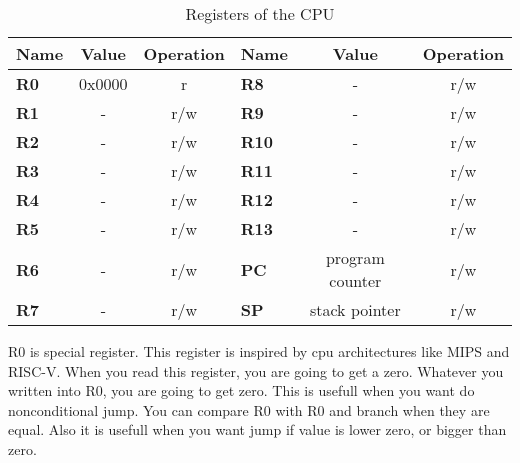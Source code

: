 \begin{table}[h]
    \centering
    \caption{Registers of the CPU}
    \label{tab:registers}
    \begin{tabular}{|l|c|c|l|c|c|}
        \hline
        \multicolumn{1}{|c|}{\textbf{Name}} & \textbf{Value} & \textbf{Operation} & \multicolumn{1}{c|}{\textbf{Name}} & \textbf{Value}  & \textbf{Operation} \\ \hline
        \textbf{R0}                         & 0x0000         & r                  & \textbf{R8}                        & -               & r/w                \\ \hline
        \textbf{R1}                         & -              & r/w                & \textbf{R9}                        & -               & r/w                \\ \hline
        \textbf{R2}                         & -              & r/w                & \textbf{R10}                       & -               & r/w                \\ \hline
        \textbf{R3}                         & -              & r/w                & \textbf{R11}                       & -               & r/w                \\ \hline
        \textbf{R4}                         & -              & r/w                & \textbf{R12}                       & -               & r/w                \\ \hline
        \textbf{R5}                         & -              & r/w                & \textbf{R13}                       & -               & r/w                \\ \hline
        \textbf{R6}                         & -              & r/w                & \textbf{PC}                        & program counter & r/w                \\ \hline
        \textbf{R7}                         & -              & r/w                & \textbf{SP}                        & stack pointer   & r/w                \\ \hline
    \end{tabular}
\end{table}

R0 is special register. This register is inspired by cpu architectures like
MIPS and RISC-V. When you read this register, you are going to get a zero. 
Whatever you written into R0, you are going to get zero. This is usefull
when you want do nonconditional jump. You can compare R0 with R0 and branch
when they are equal. Also it is usefull when you want jump if value is lower 
zero, or bigger than zero.

